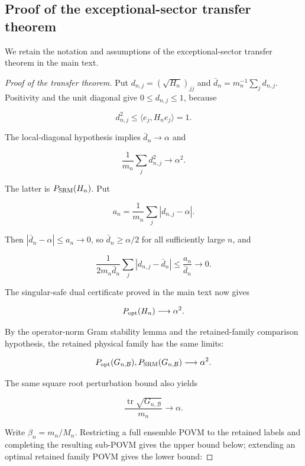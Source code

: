 \subsection{Proof of the exceptional-sector transfer theorem}

We retain the notation and assumptions of the exceptional-sector transfer
theorem in the main text.

\begin{proof}[Proof of the transfer theorem]
Put \(d_{n,j}=(\sqrt{H_n})_{jj}\) and
\(\bar d_n=m_n^{-1}\sum_jd_{n,j}\). Positivity and the unit diagonal give
\(0\le d_{n,j}\le1\), because

\[
d_{n,j}^2
\le\langle e_j,H_ne_j\rangle=1.
\]

The local-diagonal hypothesis implies
\(\bar d_n\to\alpha\) and

\[
\frac1{m_n}\sum_jd_{n,j}^2\longrightarrow\alpha^2.
\]

The latter is \(P_{\rm SRM}(H_n)\). Put

\[
a_n=\frac1{m_n}\sum_j|d_{n,j}-\alpha|.
\]

Then \(|\bar d_n-\alpha|\le a_n\to0\), so \(\bar d_n\ge\alpha/2\) for all
sufficiently large \(n\), and

\[
\frac1{2m_n\bar d_n}\sum_j|d_{n,j}-\bar d_n|
\le\frac{a_n}{\bar d_n}\longrightarrow0.
\]

The singular-safe dual certificate proved in the main text now gives

\[
P_{\rm opt}(H_n)\longrightarrow\alpha^2.
\]

By the operator-norm Gram stability lemma and the retained-family
comparison hypothesis, the retained physical family has the same limits:

\begin{equation}
\label{eq:transfer-retained-limits}
P_{\rm opt}(G_{n,\mathcal B}),
P_{\rm SRM}(G_{n,\mathcal B})\longrightarrow\alpha^2.
\end{equation}

The same square root perturbation bound also yields

\begin{equation}
\label{eq:transfer-retained-trace}
\frac{\operatorname{tr}\sqrt{G_{n,\mathcal B}}}{m_n}
\longrightarrow\alpha.
\end{equation}

Write \(\beta_n=m_n/M_n\). Restricting a full ensemble POVM to the retained
labels and completing the resulting sub-POVM gives the upper bound below;
extending an optimal retained family POVM gives the lower bound:


\end{proof}
